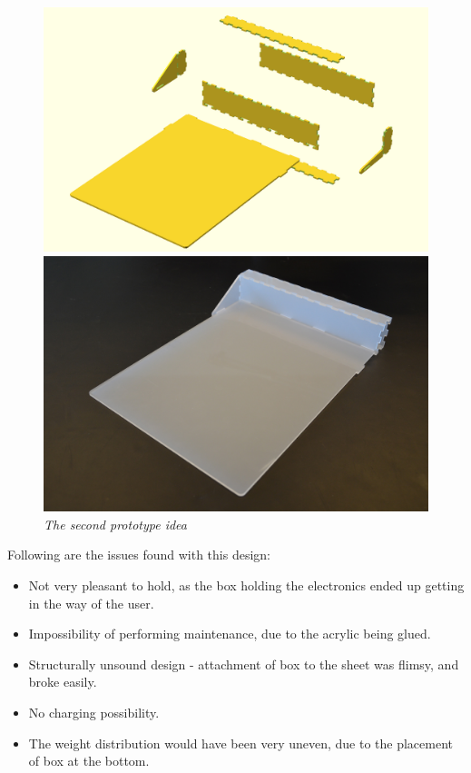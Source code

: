 \begin{figure}[h]
\setlength{\belowcaptionskip}{0mm}
\begin{minipage}[b]{.5\textwidth}
\includegraphics[width=1.05\textwidth]{figures/iterations/v3.png}
\end{minipage}
\begin{minipage}[b]{.5\textwidth}
\includegraphics[width=1\textwidth]{figures/iterations/v3-photo.jpg}
\end{minipage}
\caption{\small {\it {The second prototype idea}}} 
\label{fig:v2}
\end{figure}

Following are the issues found with this design:

\begin{itemize} \itemsep0em
	\item Not very pleasant to hold, as the box holding the electronics ended up getting in the way of the user.
	\item Impossibility of performing maintenance, due to the acrylic being glued.
	\item Structurally unsound design - attachment of box to the sheet was flimsy, and broke easily.
	\item No charging possibility.
	\item The weight distribution would have been very uneven, due to the placement of box at the bottom.
\end{itemize}

